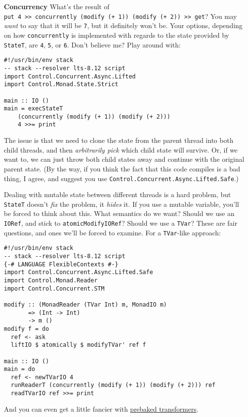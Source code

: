 \textbf{Concurrency} What's the result of
\texttt{put\ 4\ \textgreater{}\textgreater{}\ concurrently\ (modify\ (+\ 1))\ (modify\ (+\ 2))\ \textgreater{}\textgreater{}\ get}?
You may \emph{want} to say that it will be \texttt{7}, but it definitely
won't be. Your options, depending on how \texttt{concurrently} is
implemented with regards to the state provided by \texttt{StateT}, are
\texttt{4}, \texttt{5}, or \texttt{6}. Don't believe me? Play around
with:

\begin{verbatim}
#!/usr/bin/env stack
-- stack --resolver lts-8.12 script
import Control.Concurrent.Async.Lifted
import Control.Monad.State.Strict

main :: IO ()
main = execStateT
    (concurrently (modify (+ 1)) (modify (+ 2)))
    4 >>= print
\end{verbatim}
The issue is that we need to clone the state from the parent thread into
both child threads, and then \emph{arbitrarily pick} which child state
will survive. Or, if we want to, we can just throw both child states
away and continue with the original parent state. (By the way, if you
think the fact that this code compiles is a bad thing, I agree, and
suggest you use \texttt{Control.Concurrent.Async.Lifted.Safe}.)

Dealing with mutable state between different threads is a hard problem,
but \texttt{StateT} doesn't \emph{fix} the problem, it \emph{hides} it.
If you use a mutable variable, you'll be forced to think about this.
What semantics do we want? Should we use an \texttt{IORef}, and stick to
\texttt{atomicModifyIORef}? Should we use a \texttt{TVar}? These are
fair questions, and ones we'll be forced to examine. For a
\texttt{TVar}-like approach:

\begin{verbatim}
#!/usr/bin/env stack
-- stack --resolver lts-8.12 script
{-# LANGUAGE FlexibleContexts #-}
import Control.Concurrent.Async.Lifted.Safe
import Control.Monad.Reader
import Control.Concurrent.STM

modify :: (MonadReader (TVar Int) m, MonadIO m)
       => (Int -> Int)
       -> m ()
modify f = do
  ref <- ask
  liftIO $ atomically $ modifyTVar' ref f

main :: IO ()
main = do
  ref <- newTVarIO 4
  runReaderT (concurrently (modify (+ 1)) (modify (+ 2))) ref
  readTVarIO ref >>= print
\end{verbatim}
And you can even get a little fancier with
\href{https://www.stackage.org/package/monad-unlift-ref}{prebaked
transformers}.

